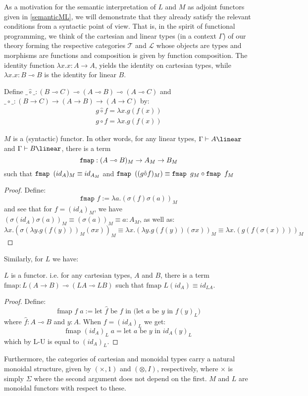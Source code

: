 As a motivation for the semantic interpretation of $L$ and $M$ as adjoint functors given in \ref{semanticML}, we will demonstrate that they already satisfy the relevant conditions from a syntactic point of view. That is, in the spirit of functional programming, we think of the cartesian and linear types (in a context $\Gamma$) of our theory forming the respective categories $\mathcal{T}$ and $\mathcal{L}$ whose objects are types and morphisms are functions and composition is given by function composition. The identity function $\lambda x. x : A \to A$, yields the identity on cartesian types, while $\lambda x.x : B \multimap B$ is the identity for linear $B$.
\begin{defn}\label{syntcomp}Define $\_\hat \circ\_ : (B \multimap C) \multimap (A \multimap B) \multimap (A \multimap C)$ and $\_ \circ\_ : (B \to C) \to (A \to B) \to (A \to C)$ by:
  \[
    \begin{split}
    g \hat \circ f = \lambda x. g(f(x))\\
    g \circ f = \lambda x. g(f(x))
    \end{split}
  \]
\end{defn}

\begin{thm}\label{Mfunc}
  $M$ is a (syntactic) functor. In other words, for any linear types, $\Gamma \vdash A \linear$ and $\Gamma \vdash B \linear$, there is a term
\[
  \textup{\texttt{fmap}} : (A \multimap B)_M \to A_M \to B_M
  \]
such that $\textup{\texttt{fmap }} (id_A)_M \equiv id_{A_M}$ and $\textup{\texttt{fmap }} ((g \hat \circ f)_M) \equiv \textup{\texttt{fmap }} g_M \circ \textup{\texttt{fmap }} f_M$
  \begin{proof}
  Define:
  \[
    \texttt{fmap }f := \lambda a. (\sigma(f)\sigma(a))_M
  \]
  and see that for $f = (id_A)_M$, we have $(\sigma(id_A)\sigma(a))_M \equiv (\sigma(a))_M \equiv a : A_M$, as well as:
  \[
    \lambda x. (\sigma(\lambda y. g(f(y)))_M(\sigma x))_M \equiv \lambda x. (\lambda y. g(f(y))(\sigma x))_M \equiv \lambda x. (g(f(\sigma(x))))_M
  \]
\end{proof}
\end{thm}
Similarly, for $L$ we have:
\begin{thm}
  $L$ is a functor. i.e. for any cartesian types, $A$ and $B$, there is a term $\text{fmap} : L(A \to B) \multimap (LA \multimap LB)$ such that $\text{fmap } L(id_A) \equiv id_{LA}$.
  \begin{proof}
  Define:
  \[
    \text{fmap } f \; a := \text{let $\hat f$ be $f$ in (let $a$ be $y$ in $f(y)_L$)}
  \]
  where $\hat f : A \multimap B$ and $y : A$. When $f = (id_A)_L$ we get:
  \[
    \text{fmap } (id_A)_L \; a = \text{let $a$ be $y$ in $id_A(y)_L$}
  \]
  which by L-U is equal to $(id_A)_L$.
\end{proof}
\end{thm}
Furthermore, the categories of cartesian and monoidal types carry a natural monoidal structure, given by $(\times, 1)$ and $(\otimes, I)$, respectively, where $\times$ is simply $\Sigma$ where the second argument does not depend on the first. $M$ and $L$ are monoidal functors with respect to these.


